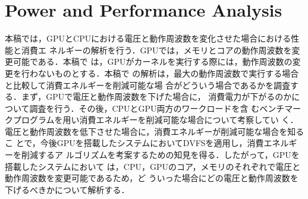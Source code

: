 \section{Power and Performance Analysis}

本稿では，GPUとCPUにおける電圧と動作周波数を変化させた場合における性能と消費エ
ネルギーの解析を行う．GPUでは，メモリとコアの動作周波数を変更可能である．本稿で
は，GPUがカーネルを実行する際には，動作周波数の変更を行わないものとする．本稿で
の解析は，最大の動作周波数で実行する場合と比較して消費エネルギーを削減可能な場
合がどういう場合であるかを調査する．まず，GPUで電圧と動作周波数を下げた場合に，
消費電力が下がるのかについて調査を行う．その後，CPUとGPU両方のワークロードを含
むベンチマークプログラムを用い消費エネルギーを削減可能な場合について考察してい
く．電圧と動作周波数を低下させた場合に，消費エネルギーが削減可能な場合を知るこ
とで，今後GPUを搭載したシステムにおいてDVFSを適用し，消費エネルギーを削減するア
ルゴリズムを考案するための知見を得る．したがって，GPUを搭載したシステムにおいて
は，CPU，GPUのコア，メモリのそれぞれで電圧と動作周波数を変更可能であるため，ど
ういった場合にどの電圧と動作周波数を下げるべきかについて解析する．
